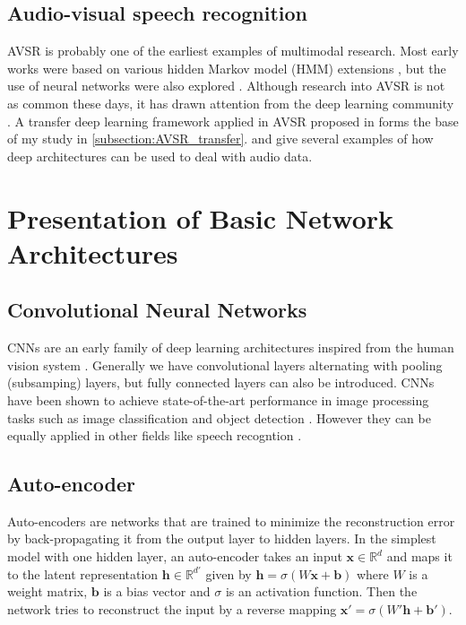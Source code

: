 \subsection{Audio-visual speech recognition}

AVSR is probably one of the earliest examples of multimodal research.
Most early works were based on various hidden Markov model (HMM) extensions
\cite{G. Potamianos 2004}, but the use of neural networks were also
explored \cite{C. Bregler 1994, B. P. Yuhas 1989}. Although research
into AVSR is not as common these days, it has drawn attention from the
deep learning community
\cite{J. Ngiam 2011, K. Noda 2014, A. K. Katsaggelos 2015}.
A transfer deep learning framework applied in AVSR proposed in
\cite{S. Moon 2015} forms the base of my study in
\ref{subsection:AVSR_transfer}. \cite{L. Deng 2013} and
\cite{G. Hinton 2012} give several examples of how deep architectures can
be used to deal with audio data.

\section{Presentation of Basic Network Architectures}
\label{section:networks}

\subsection{Convolutional Neural Networks}

CNNs are an early family of deep learning
architectures inspired from the human vision system \cite{Y. LeCun 1998}.
Generally we have convolutional layers alternating with pooling
(subsamping) layers, but fully connected layers can also be introduced.
CNNs have been shown to achieve state-of-the-art performance in
image processing tasks such as image classification
\cite{A. Krizhevsky 2012} and object detection \cite{Y. LeCun 2010}.
However they can be equally applied in other fields like speech recogntion
\cite{L. Deng 2013}.

\subsection{Auto-encoder}

Auto-encoders are networks that are trained to minimize the reconstruction
error by back-propagating it from the output layer to hidden layers.
In the simplest model with one hidden layer, an auto-encoder takes an
input $\mathbf{x} \in \mathbb{R}^d$ and maps it to the latent
representation $\mathbf{h} \in \mathbb{R}^{d'}$ given by
$\mathbf{h} = \sigma(W\mathbf{x}+\mathbf{b})$ where $W$
is a weight matrix, $\mathbf{b}$ is a bias vector and $\sigma$ is an
activation function. Then the network tries to reconstruct the input
by a reverse mapping $\mathbf{x'} = \sigma(W'\mathbf{h}+\mathbf{b'})$.

